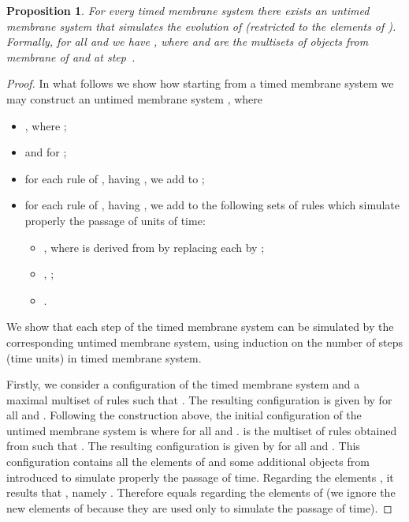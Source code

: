 \documentclass{eptcs}
\newtheorem{proposition}{Proposition}
\begin{document}
\begin{proposition}\label{tPtoP}
For every timed membrane system  there exists an untimed membrane system
 that
simulates the evolution of  (restricted to the elements of
). Formally, for all  and  we have
, where  and  are the multisets of
objects from membrane  of  and  at step~.
\end{proposition}

\begin{proof} In what follows we show how starting from
a timed membrane system 
 we may construct an untimed membrane system
, where
\begin{itemize}
\item , where ;
\item  and  for ;
\item for each rule  of ,  having , we add  to ;
\item for each rule  of ,  having , we add to  the following sets of rules
which simulate properly the passage of  units of time:
\begin{itemize}
\item , where  is derived from  by
replacing each  by ;
\item , ;
\item .
\end{itemize}
\end{itemize}
We show that each step of the timed membrane system can be simulated
by the corresponding untimed membrane system, using induction
on the number of steps (time units) in timed membrane system.

Firstly, we consider a configuration
 of the timed membrane system and a
maximal multiset  of rules such that
. The resulting configuration
 is given by
 for all  and . Following the construction above, the
initial configuration of the untimed membrane system is
 where  for
all  and .  is the multiset of rules
obtained from  such that
. The resulting
configuration  is given by
 for all  and . This configuration contains all the elements of
 and some additional objects from  introduced to simulate
properly the passage of time. Regarding the elements , it
results that , namely
. Therefore  equals  regarding
the elements of  (we ignore the new elements of 
because they are used only to simulate the passage of time).


\end{proof}
\end{document}
